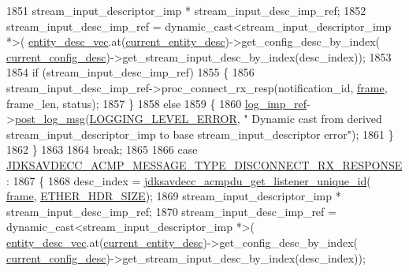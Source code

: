 \begin{DoxyCode}
1851         stream\_input\_descriptor\_imp * stream\_input\_desc\_imp\_ref;
1852         stream\_input\_desc\_imp\_ref = \textcolor{keyword}{dynamic\_cast<}stream\_input\_descriptor\_imp *\textcolor{keyword}{>}(
      \hyperlink{classavdecc__lib_1_1end__station__imp_a72edab41bc56e3c1757944a7df188a3d}{entity\_desc\_vec}.at(\hyperlink{classavdecc__lib_1_1end__station__imp_afd78c89df26ba7641e1adb764c0e827d}{current\_entity\_desc})->get\_config\_desc\_by\_index(
      \hyperlink{classavdecc__lib_1_1end__station__imp_a60b1af40d35e8a86b0082c54ab6cb6a8}{current\_config\_desc})->get\_stream\_input\_desc\_by\_index(desc\_index));
1853 
1854         \textcolor{keywordflow}{if} (stream\_input\_desc\_imp\_ref)
1855         \{
1856             stream\_input\_desc\_imp\_ref->proc\_connect\_rx\_resp(notification\_id, 
      \hyperlink{gst__avb__playbin_8c_ac8e710e0b5e994c0545d75d69868c6f0}{frame}, frame\_len, status);
1857         \}
1858         \textcolor{keywordflow}{else}
1859         \{
1860             \hyperlink{namespaceavdecc__lib_acbe3e2a96ae6524943ca532c87a28529}{log\_imp\_ref}->\hyperlink{classavdecc__lib_1_1log_a68139a6297697e4ccebf36ccfd02e44a}{post\_log\_msg}(\hyperlink{namespaceavdecc__lib_a501055c431e6872ef46f252ad13f85cdaf2c4481208273451a6f5c7bb9770ec8a}{LOGGING\_LEVEL\_ERROR}, \textcolor{stringliteral}{"
      Dynamic cast from derived stream\_input\_descriptor\_imp to base stream\_input\_descriptor error"});
1861         \}
1862     \}
1863 
1864     \textcolor{keywordflow}{break};
1865 
1866     \textcolor{keywordflow}{case} \hyperlink{group__acmp__message__type_ga5bdc8bcdbdc39ae196eebe87d912f3e3}{JDKSAVDECC\_ACMP\_MESSAGE\_TYPE\_DISCONNECT\_RX\_RESPONSE}
      :
1867     \{
1868         desc\_index = \hyperlink{group__acmpdu_ga36867bfc130619cbea38caa3ce54bc89}{jdksavdecc\_acmpdu\_get\_listener\_unique\_id}(
      \hyperlink{gst__avb__playbin_8c_ac8e710e0b5e994c0545d75d69868c6f0}{frame}, \hyperlink{namespaceavdecc__lib_a6c827b1a0d973e18119c5e3da518e65ca9512ad9b34302ba7048d88197e0a2dc0}{ETHER\_HDR\_SIZE});
1869         stream\_input\_descriptor\_imp * stream\_input\_desc\_imp\_ref;
1870         stream\_input\_desc\_imp\_ref = \textcolor{keyword}{dynamic\_cast<}stream\_input\_descriptor\_imp *\textcolor{keyword}{>}(
      \hyperlink{classavdecc__lib_1_1end__station__imp_a72edab41bc56e3c1757944a7df188a3d}{entity\_desc\_vec}.at(\hyperlink{classavdecc__lib_1_1end__station__imp_afd78c89df26ba7641e1adb764c0e827d}{current\_entity\_desc})->get\_config\_desc\_by\_index(
      \hyperlink{classavdecc__lib_1_1end__station__imp_a60b1af40d35e8a86b0082c54ab6cb6a8}{current\_config\_desc})->get\_stream\_input\_desc\_by\_index(desc\_index));

\end{DoxyCode}
